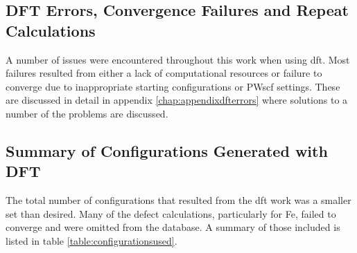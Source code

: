 \FloatBarrier
\subsection{DFT Errors, Convergence Failures and Repeat Calculations}

A number of issues were encountered throughout this work when using \acrshort{dft}.  Most failures resulted from either a lack of computational resources or failure to converge due to inappropriate starting configurations or PWscf settings.  These are discussed in detail in appendix \ref{chap:appendixdfterrors} where solutions to a number of the problems are discussed.


\FloatBarrier
\subsection{Summary of Configurations Generated with DFT}

The total number of configurations that resulted from the \acrshort{dft} work was a smaller set than desired.  Many of the defect calculations, particularly for \Gls{Fe}, failed to converge and were omitted from the database.  A summary of those included is listed in table \ref{table:configurationsused}.

